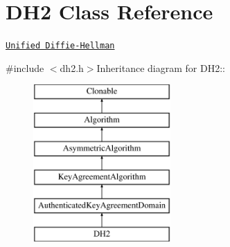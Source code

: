 \hypertarget{class_d_h2}{
\section{DH2 Class Reference}
\label{class_d_h2}
}


\href{http://www.weidai.com/scan-mirror/ka.html#DH2}{\tt Unified Diffie-\/Hellman}  


{\ttfamily \#include $<$dh2.h$>$}Inheritance diagram for DH2::\begin{figure}[H]
\begin{center}
\leavevmode
\includegraphics[height=6cm]{class_d_h2}
\end{center}
\end{figure}
